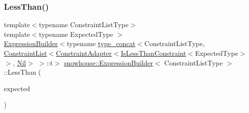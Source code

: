 \mbox{\label{structsnowhouse_1_1ExpressionBuilder_a72113342b074aafb3fb2651350300b87}} 
\subsubsection{\texorpdfstring{LessThan()}{LessThan()}}
{\footnotesize\ttfamily template$<$typename Constraint\+List\+Type$>$ \\
template$<$typename Expected\+Type $>$ \\
\mbox{\hyperlink{structsnowhouse_1_1ExpressionBuilder}{Expression\+Builder}}$<$typename \mbox{\hyperlink{structsnowhouse_1_1type__concat}{type\+\_\+concat}}$<$Constraint\+List\+Type, \mbox{\hyperlink{structsnowhouse_1_1ConstraintList}{Constraint\+List}}$<$\mbox{\hyperlink{structsnowhouse_1_1ConstraintAdapter}{Constraint\+Adapter}}$<$\mbox{\hyperlink{structsnowhouse_1_1IsLessThanConstraint}{Is\+Less\+Than\+Constraint}}$<$Expected\+Type$>$ $>$, \mbox{\hyperlink{structsnowhouse_1_1Nil}{Nil}}$>$ $>$\+::t$>$ \mbox{\hyperlink{structsnowhouse_1_1ExpressionBuilder}{snowhouse\+::\+Expression\+Builder}}$<$ Constraint\+List\+Type $>$\+::Less\+Than (\begin{DoxyParamCaption}\item[{const Expected\+Type \&}]{expected }\end{DoxyParamCaption})\hspace{0.3cm}{\ttfamily [inline]}}

\mbox{\label{structsnowhouse_1_1ExpressionBuilder_a352da05ec10ff1b6daa2fd3c5f2fad80}} 
